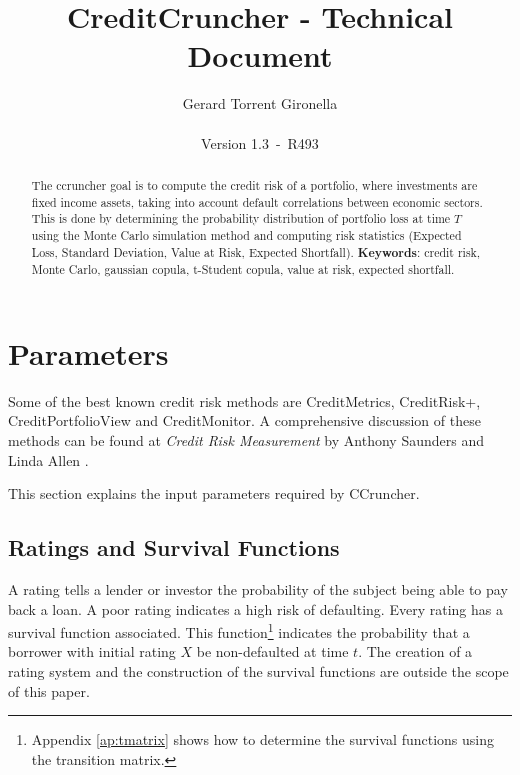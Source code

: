 \documentclass[a4paper,12pt,final]{article}
\def\numversion{1.3}
\def\svnversion{R493}
\begin{document}
\title{CreditCruncher - Technical Document}
\author{Gerard Torrent Gironella\\\\Version \numversion\ -\ \svnversion}
\date{}
\maketitle


\begin{abstract}
The ccruncher goal is to compute the credit risk of a portfolio, where 
investments are fixed income assets, taking into account default correlations
between economic sectors. This is done by determining the probability distribution 
of portfolio loss at time $T$ using the Monte Carlo simulation method and computing 
risk statistics (Expected Loss, Standard Deviation, Value at Risk, Expected 
Shortfall).
\newline
\newline
\textbf{Keywords}: credit risk, Monte Carlo, gaussian copula, t-Student copula,
value at risk, expected shortfall.
\end{abstract}
\newpage


\tableofcontents
\newpage


\section{Parameters}

Some of the best known credit risk methods are CreditMetrics, CreditRisk+, 
CreditPortfolioView and CreditMonitor. A comprehensive discussion of these
methods can be found at \emph{Credit Risk Measurement} by Anthony Saunders 
and Linda Allen \cite{ref:saunders_allen}.
\newline

This section explains the input parameters required by CCruncher.

\subsection{Ratings and Survival Functions}
A rating tells a lender or investor the probability of the subject being 
able to pay back a loan. A poor rating indicates a high risk of defaulting.
Every rating has a survival function associated. This function\footnote{
Appendix \ref{ap:tmatrix} shows how to determine the survival functions 
using the transition matrix.} indicates the probability that a borrower with 
initial rating $X$ be non-defaulted at time $t$. The creation of a rating 
system and the construction of the survival functions are outside the scope 
of this paper.
\end{document}
